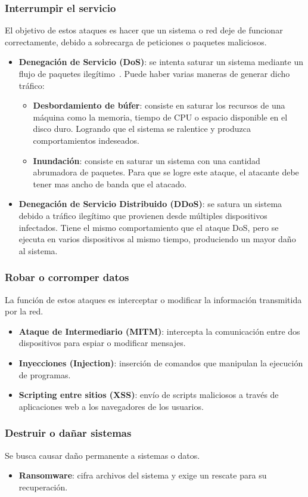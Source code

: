 \subsubsection{Interrumpir el servicio}
\label{subsubsec:InterrumpirServicio}
El objetivo de estos ataques es hacer que un sistema o red deje de funcionar correctamente, debido a sobrecarga de peticiones o paquetes maliciosos.
\begin{itemize}
    \item \textbf{Denegación de Servicio (DoS)}: se intenta saturar un sistema mediante un flujo de paquetes ilegítimo~\cite{ataque_dos}. Puede haber varias maneras de generar dicho tráfico:
    \begin{itemize}
        \item \textbf{Desbordamiento de búfer}: consiste en saturar los recursos de una máquina como la memoria, tiempo de CPU o espacio disponible en el disco duro. Logrando que el sistema se ralentice y produzca comportamientos indeseados.
        \item \textbf{Inundación}: consiste en saturar un sistema con una cantidad abrumadora de paquetes. Para que se logre este ataque, el atacante debe tener mas ancho de banda que el atacado.
    \end{itemize}
    \item \textbf{Denegación de Servicio Distribuido (DDoS)}: se satura un sistema debido a tráfico ilegítimo que provienen desde múltiples dispositivos infectados. Tiene el mismo comportamiento que el ataque DoS, pero se ejecuta en varios dispositivos al mismo tiempo, produciendo un mayor daño al sistema.
\end{itemize}

\subsubsection{Robar o corromper datos}
\label{subsubsec:RobarDatos}
La función de estos ataques es interceptar o modificar la información transmitida por la red.
\begin{itemize}
    \item \textbf{Ataque de Intermediario (MITM)}: intercepta la comunicación entre dos dispositivos para espiar o modificar mensajes.
    \item \textbf{Inyecciones (Injection)}: inserción de comandos que manipulan la ejecución de programas.
    \item \textbf{Scripting entre sitios (XSS)}: envío de scripts maliciosos a través de aplicaciones web a los navegadores de los usuarios.
\end{itemize}

\subsubsection{Destruir o dañar sistemas}
\label{subsubsec:DestruirSistemas}
Se busca causar daño permanente a sistemas o datos.
\begin{itemize}
    \item \textbf{Ransomware}: cifra archivos del sistema y exige un rescate para su recuperación.
\end{itemize}
